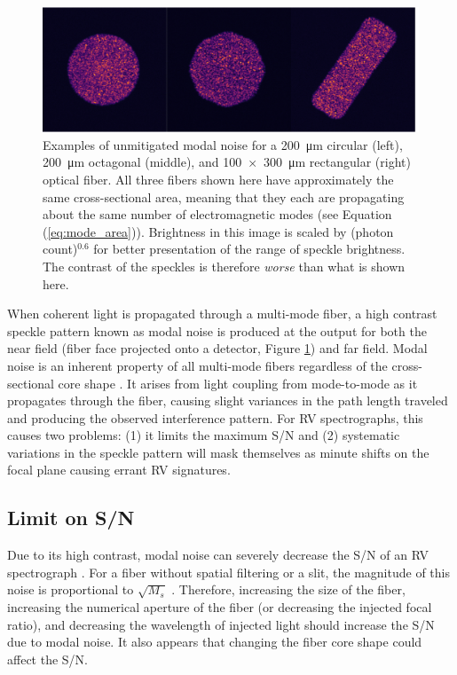 \begin{figure}
\centering
	\includegraphics[width=\columnwidth]{figures-2/fiber_example.pdf}
	\caption{Examples of unmitigated modal noise for a \SI{200}{\micro\meter} circular (left), \SI{200}{\micro\meter} octagonal (middle), and \SI{100x300}{\micro\meter} rectangular (right) optical fiber. All three fibers shown here have approximately the same cross-sectional area, meaning that they each are propagating about the same number of electromagnetic modes (see Equation (\ref{eq:mode_area})). Brightness in this image is scaled by (photon count)$^{0.6}$ for better presentation of the range of speckle brightness. The contrast of the speckles is therefore \textit{worse} than what is shown here.}
\label{fig:fiber_example}
\end{figure}

When coherent light is propagated through a multi-mode fiber, a high contrast speckle pattern known as modal noise is produced at the output for both the near field (fiber face projected onto a detector, Figure \ref{fig:fiber_example}) and far field. Modal noise is an inherent property of all multi-mode fibers regardless of the cross-sectional core shape \citep{sablowski_comparing_2016}. It arises from light coupling from mode-to-mode as it propagates through the fiber, causing slight variances in the path length traveled and producing the observed interference pattern. For RV spectrographs, this causes two problems: (1) it limits the maximum S/N and (2) systematic variations in the speckle pattern will mask themselves as minute shifts on the focal plane causing errant RV signatures.

\subsection{Limit on S/N}

Due to its high contrast, modal noise can severely decrease the S/N of an RV spectrograph \citep{epworth_phenomenon_1978, baudrand_modal_2001, lemke_modal_2011, iuzzolino_preliminary_2014}. For a fiber without spatial filtering or a slit, the magnitude of this noise is proportional to $\sqrt{M_s}$ \citep{goodman_statistics_1981}. Therefore, increasing the size of the fiber, increasing the numerical aperture of the fiber (or decreasing the injected focal ratio), and decreasing the wavelength of injected light should increase the S/N due to modal noise. It also appears that changing the fiber core shape could affect the S/N.

